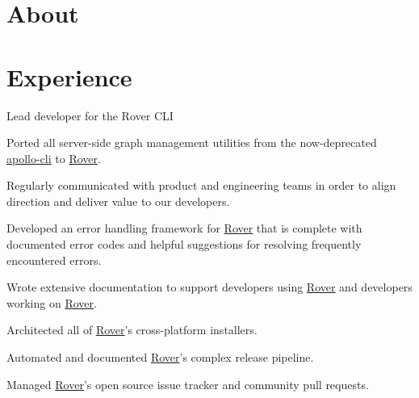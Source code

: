 \documentclass[]{deedy-resume-openfont}
\begin{document}
%
%

%
%



\section{About}

\section{Experience}

\vspace{\topsep}
Lead developer for the Rover CLI
\begin{tightemize}
\item Ported all server-side graph management utilities from the now-deprecated \href{https://github.com/apollographql/apollo-tooling}{apollo-cli} to \href{https://github.com/apollographql/rover}{Rover}.
\item Regularly communicated with product and engineering teams in order to align direction and deliver value to our developers.
\item Developed an error handling framework for \href{https://github.com/apollographql/rover}{Rover} that is complete with documented error codes and helpful suggestions for resolving frequently encountered errors.
\item Wrote extensive documentation to support developers using \href{https://github.com/apollographql/rover}{Rover} and developers working on \href{https://github.com/apollographql/rover}{Rover}.
\item Architected all of \href{https://github.com/apollographql/rover}{Rover}'s cross-platform installers.
\item Automated and documented \href{https://github.com/apollographql/rover}{Rover}'s complex release pipeline.
\item Managed \href{https://github.com/apollographql/rover}{Rover}'s open source issue tracker and community pull requests.
\end{tightemize}
\sectionsep
\end{document}
